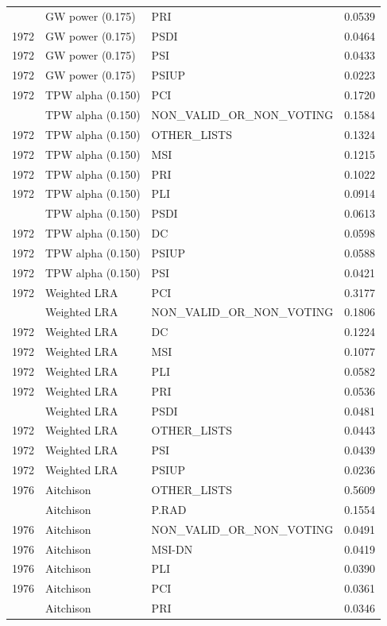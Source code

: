 \begin{longtable}[t]{rllr}
\addlinespace
1972 & GW power (0.175) & PRI & 0.0539\\
1972 & GW power (0.175) & PSDI & 0.0464\\
1972 & GW power (0.175) & PSI & 0.0433\\
1972 & GW power (0.175) & PSIUP & 0.0223\\
1972 & TPW alpha (0.150) & PCI & 0.1720\\
\addlinespace
1972 & TPW alpha (0.150) & NON\_VALID\_OR\_NON\_VOTING & 0.1584\\
1972 & TPW alpha (0.150) & OTHER\_LISTS & 0.1324\\
1972 & TPW alpha (0.150) & MSI & 0.1215\\
1972 & TPW alpha (0.150) & PRI & 0.1022\\
1972 & TPW alpha (0.150) & PLI & 0.0914\\
\addlinespace
1972 & TPW alpha (0.150) & PSDI & 0.0613\\
1972 & TPW alpha (0.150) & DC & 0.0598\\
1972 & TPW alpha (0.150) & PSIUP & 0.0588\\
1972 & TPW alpha (0.150) & PSI & 0.0421\\
1972 & Weighted LRA & PCI & 0.3177\\
\addlinespace
1972 & Weighted LRA & NON\_VALID\_OR\_NON\_VOTING & 0.1806\\
1972 & Weighted LRA & DC & 0.1224\\
1972 & Weighted LRA & MSI & 0.1077\\
1972 & Weighted LRA & PLI & 0.0582\\
1972 & Weighted LRA & PRI & 0.0536\\
\addlinespace
1972 & Weighted LRA & PSDI & 0.0481\\
1972 & Weighted LRA & OTHER\_LISTS & 0.0443\\
1972 & Weighted LRA & PSI & 0.0439\\
1972 & Weighted LRA & PSIUP & 0.0236\\
1976 & Aitchison & OTHER\_LISTS & 0.5609\\
\addlinespace
1976 & Aitchison & P.RAD & 0.1554\\
1976 & Aitchison & NON\_VALID\_OR\_NON\_VOTING & 0.0491\\
1976 & Aitchison & MSI-DN & 0.0419\\
1976 & Aitchison & PLI & 0.0390\\
1976 & Aitchison & PCI & 0.0361\\
\addlinespace
1976 & Aitchison & PRI & 0.0346\\

\end{longtable}
